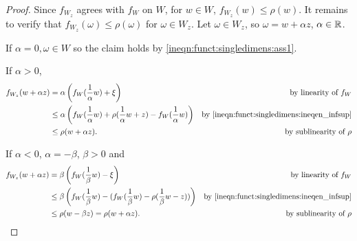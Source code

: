 \begin{proof}
Since $f_{W_{z}}$ agrees with $f_W$ on $W$, for $w \in W$, $f_{W_{z}}(w) \leq \rho(w)$. It remains to verify that $f_{W_{z}}(\omega) \leq \rho(\omega)$ for $\omega \in W_{z}$. Let $\omega \in W_z$, so $\omega = w + \alpha z$, $\alpha \in {\mathbb R}$. 

If $\alpha = 0, \omega \in W$ so the claim holds by \ref{ineqn:funct:singledimens:ass1}.

If $\alpha > 0$,
\begin{align*}
    f_{W_{z}} (w + \alpha z) &= \alpha \left (f_{W} (\frac{1}{\alpha} w) + \xi \right ) & \text{by linearity of $f_{W}$} \\
                             &\leq \alpha \left ( f_{W} (\frac{1}{\alpha} w) + \rho (\frac{1}{\alpha} w + z) - f_{W} (\frac{1}{\alpha} w) \right ) & \text{by \ref{ineqn:funct:singledimens:ineqen_infsup}} \\
                             &\leq \rho (w + \alpha z). & \text{by sublinearity of $\rho$}
\end{align*}

If $\alpha < 0$,  $\alpha = - \beta$, $\beta > 0$ and
\begin{align*}
    f_{W_{z}} (w + \alpha z) &= \beta \left (f_{W} (\frac{1}{\beta} w) - \xi \right ) & \text{by linearity of $f_{W}$} \\
                             &\leq \beta \left ( f_{W} (\frac{1}{\beta} w) - (f_{W} (\frac{1}{\beta} w) - \rho (\frac{1}{\beta} w - z) ) \right ) & \text{by \ref{ineqn:funct:singledimens:ineqen_infsup}} \\
                             &\leq \rho (w - \beta z) = \rho (w + \alpha z). & \text{by sublinearity of $\rho$}
\end{align*}
\end{proof}

